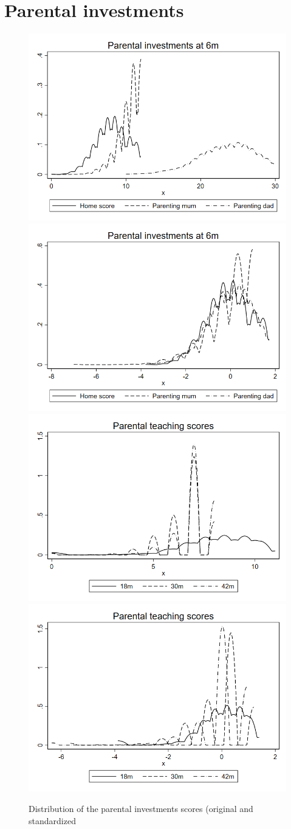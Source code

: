 \documentclass{article}
\begin{document}
\clearpage


\section{Parental investments }

\begin{figure}[H]
  \centering
  \includegraphics[width=0.45\linewidth]{../figures/Investments1_unadj.png}
  \includegraphics[width=0.45\linewidth]{../figures/Investments1.png} \\
  \includegraphics[width=0.45\linewidth]{../figures/Investments2_unadj.png} 
  \includegraphics[width=0.45\linewidth]{../figures/Investments2.png} 
  \caption{Distribution of the parental investments scores (original and standardized}
\end{figure}
\end{document}
